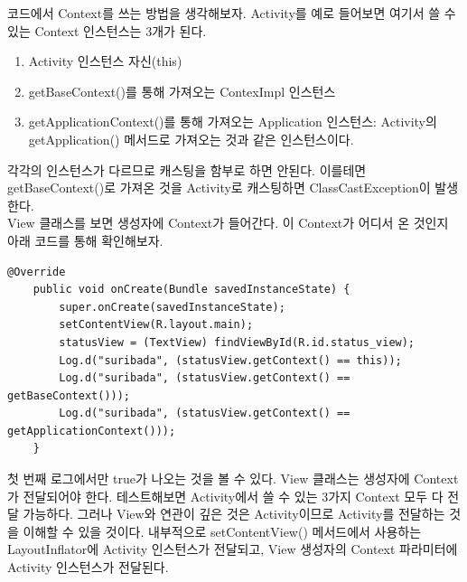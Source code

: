 코드에서 Context를 쓰는 방법을 생각해보자.
Activity를 예로 들어보면 여기서 쓸 수 있는 Context 인스턴스는 3개가 된다. 
\begin{enumerate}
\item Activity 인스턴스 자신(this)
\item getBaseContext()를 통해 가져오는 ContexImpl 인스턴스
\item getApplicationContext()를 통해 가져오는 Application 인스턴스: Activity의 getApplication() 메서드로 가져오는 것과 같은 인스턴스이다.
\end{enumerate}

각각의 인스턴스가 다르므로 캐스팅을 함부로 하면 안된다. 이를테면 getBaseContext()로 가져온 것을 Activity로 캐스팅하면 ClassCastException이 발생한다.\\

View 클래스를 보면 생성자에 Context가 들어간다. 이 Context가 어디서 온 것인지 아래 코드를 통해 확인해보자.
\begin{lstlisting}[frame=single]
    @Override
    public void onCreate(Bundle savedInstanceState) {
        super.onCreate(savedInstanceState);
        setContentView(R.layout.main);
        statusView = (TextView) findViewById(R.id.status_view);
        Log.d("suribada", (statusView.getContext() == this));
        Log.d("suribada", (statusView.getContext() == getBaseContext()));
        Log.d("suribada", (statusView.getContext() == getApplicationContext()));
    }
\end{lstlisting}
첫 번째 로그에서만 true가 나오는 것을 볼 수 있다. View 클래스는 생성자에 Context가 전달되어야 한다. 테스트해보면 Activity에서 쓸 수 있는 3가지 Context 모두 다 전달 가능하다. 그러나 View와 연관이 깊은 것은 Activity이므로 Activity를 전달하는 것을 이해할 수 있을 것이다.
내부적으로 setContentView() 메서드에서 사용하는 LayoutInflator에 Activity 인스턴스가 전달되고, View 생성자의 Context 파라미터에 Activity 인스턴스가 전달된다. 
